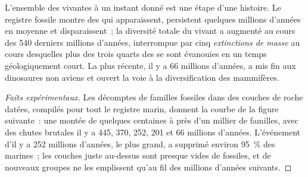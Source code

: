 \begin{proposition}\label{prop:g10:biodiversity-scales:changes}
L'ensemble des  vivantes à un instant donné est une étape d'une
histoire. Le registre fossile montre des  qui apparaissent,
persistent quelques millions d'années en moyenne et disparaissent~; la
diversité totale du vivant a augmenté au cours des 540 derniers
millions d'années, interrompue par cinq
\emph{extinctions de masse} au cours
desquelles plus des trois quarts des  se sont évanouies en un
temps géologiquement court. La plus récente, il y a 66 millions
d'années, a mis fin aux dinosaures non aviens et ouvert la voie à la
diversification des mammifères.
\end{proposition}
\begin{proof}[Faits expérimentaux]
Les décomptes de familles fossiles dans des couches de roche datées,
compilés pour tout le registre marin, donnent la courbe de la figure
suivante~: une montée de quelques centaines à près d'un millier de
familles, avec des chutes brutales il y a 445, 370, 252, 201 et 66
millions d'années. L'événement d'il y a 252 millions d'années, le plus
grand, a supprimé environ 95~\% des  marines~; les couches juste
au-dessus sont presque vides de fossiles, et de nouveaux groupes ne les
emplissent qu'au fil des millions d'années suivants.
\end{proof}

